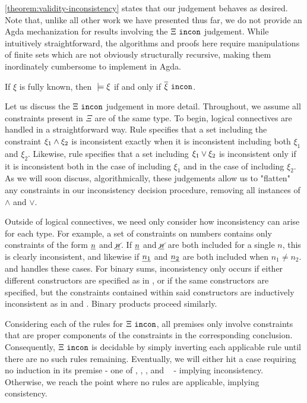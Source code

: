 \autoref{theorem:validity-inconsistency} states that our judgement behaves as desired. Note that, unlike all other work we have presented thus far, we do not provide an Agda mechanization for results involving the $\Xi ~\mathtt{incon}$ judgement.  While intuitively straightforward, the algorithms and proofs here require manipulations of finite sets which are not obviously structurally recursive, making them inordinately cumbersome to implement in Agda.

\begin{theorem}
\label{theorem:validity-inconsistency}
If $\xi$ is fully known, then $\; \models \xi$ if and only if\; $\overline{\xi} ~\mathtt{incon}$.
\end{theorem}

Let us discuss the $\Xi ~\mathtt{incon}$ judgement in more detail. Throughout, we assume all constraints present in $\Xi$ are of the same type. To begin, logical connectives are handled in a straightforward way. Rule \CINCAnd specifies that a set including the constraint $\xi_1 \wedge \xi_2$ is inconsistent exactly when it is inconsistent including both $\xi_1$ and $\xi_2$. Likewise, rule \CINCOr specifies that a set including $\xi_1 \vee \xi_2$ is inconsistent only if it is inconsistent both in the case of including $\xi_1$ and in the case of including $\xi_2$. As we will soon discuss, algorithmically, these judgements allow us to "flatten" any constraints in our inconsistency decision procedure, removing all instances of $\land$ and $\lor$.

Outside of logical connectives, we need only consider how inconsistency can arise for each type. For example, a set of constraints on numbers contains only constraints of the form $\underline{n}$ and $\underline{\cancel{n}}$. If $\underline{n}$ and $\underline{\cancel{n}}$ are both included for a single $n$, this is clearly inconsistent, and likewise if $\underline{n_1}$ and $\underline{n_2}$ are both included when $n_1 \neq n_2$. \CINCNum and \CINCNotNum handles these cases. For binary sums, inconsistency only occurs if either different constructors are specified as in \CINCInj, or if the same constructors are specified, but the constraints contained within said constructors are inductively inconsistent as in \CINCInl and \CINCInr. Binary products proceed similarly.



Considering each of the rules for $\Xi ~\mathtt{incon}$, all premises only involve constraints that are proper components of the constraints in the corresponding conclusion. Consequently, $\Xi ~\mathtt{incon}$ is decidable by simply inverting each applicable rule until there are no such rules remaining. Eventually, we will either hit a case requiring no induction in its premise - one of \CINCFalsity, \CINCNum, \CINCNotNum, and \CINCInj~ - implying inconsistency. Otherwise, we reach the point where no rules are applicable, implying consistency. 

